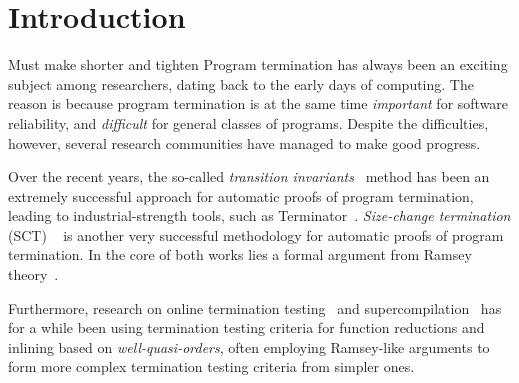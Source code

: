 \documentclass{llncs}
\newcommand{\dv}[1]{{\color{red}{\bf DV:} #1}}
\begin{document}
\newcommand{\qa}[2]{\\[-14pt]{\color{Green4} \item {#1}} {\color{blue} #2}}
\newcommand{\qanocr}[2]{\color{Green4}{#1} \color{blue}{#2}}
\newcommand{\bools}{\mathbb{B}} 
\newcommand{\nats}{\mathbb{N}} 
\newcommand{\ints}{\mathbb{Z}}
\newcommand{\finints}[1]{\mathbb{Z}_{#1}}
\newcommand{\intrange}[2]{\{{#1}..{#2}\}}
\newcommand{\intsge}[1]{\{{#1}..\}}
\newcommand{\unitty}{\mathbf{1}}
\newcommand{\voidty}{\mathbf{0}}
\newcommand{\rats}{\mathbb{Q}}
\newcommand{\enc}{\mathit{enc}} \newcommand{\dec}{\mathit{dec}}
\newcommand{\app}{\oplus}
\newcommand{\pref}{\sqsubseteq}
\newcommand{\map}{\mathit{map}}
\newcommand{\inv}{\mathit{inv}}
\newcommand{\id}{\mathit{id}}




 
\section{Introduction}\label{s:intro}


\dv{Must make shorter and tighten}
Program termination has always been an exciting subject among researchers, dating 
back to the early days of computing. The reason is because program termination is at 
the same time {\em important} for software reliability, and {\em difficult} for general 
classes of programs. Despite the difficulties, however, several research communities 
have managed to make good progress.

Over the recent years, the so-called {\em transition invariants}~\cite{podelski-rybalchenko:transition}
method has been an extremely successful approach for automatic 
proofs of program termination, leading to industrial-strength
tools, such as Terminator~\cite{terminator}. {\em Size-change 
termination} (SCT) ~\cite{Lee+:sct,jones-bohr,Sereni} is another very successful methodology
for automatic proofs of program termination. 
In the core of both works lies a formal argument from Ramsey theory~\cite{Heizmann+:sct-disjinv}.

Furthermore, research on online termination testing~\cite{leuschel-wqos} and 
supercompilation~\cite{Sorensen95analgorithm} has for a while been using termination 
testing criteria for function reductions and inlining based on {\em well-quasi-orders}, often 
employing Ramsey-like arguments to form more complex termination testing criteria from simpler ones. 
\end{document}
